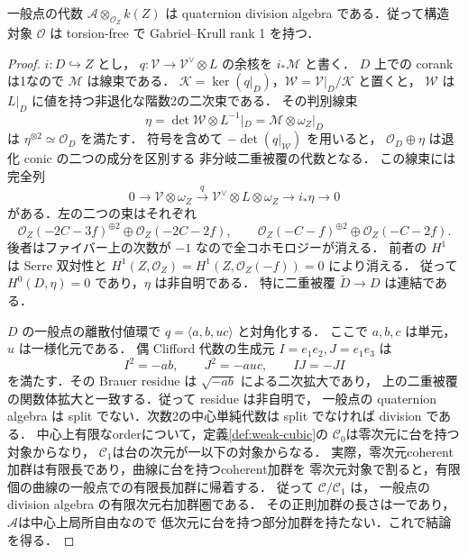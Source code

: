 \begin{proposition}
\label{prop:division-degree-three}
一般点の代数 $\mathcal A\otimes_{\mathcal O_Z}k(Z)$ は
quaternion division algebra である．従って構造対象 $\mathcal O$ は
torsion-free で Gabriel--Krull rank 1 を持つ．
\end{proposition}

\begin{proof}
$i:D\hookrightarrow Z$ とし，
$q:\mathcal V\to\mathcal V^\vee\otimes L$ の余核を $i_*\mathcal M$ と書く．
$D$ 上での corank は1なので $\mathcal M$ は線束である．
$\mathcal K=\ker(q|_D)$，$\mathcal W=\mathcal V|_D/\mathcal K$ と置くと，
$\mathcal W$ は $L|_D$ に値を持つ非退化な階数2の二次束である．
その判別線束
\[
 \eta=\det\mathcal W\otimes L^{-1}|_D
     =\mathcal M\otimes\omega_Z|_D
\]
は $\eta^{\otimes2}\simeq\mathcal O_D$ を満たす．
符号を含めて $-\det(q|_{\mathcal W})$ を用いると，
$\mathcal O_D\oplus\eta$ は退化 conic の二つの成分を区別する
非分岐二重被覆の代数となる．
この線束には完全列
\begin{equation}
 0\longrightarrow\mathcal V\otimes\omega_Z
 \xrightarrow{q}\mathcal V^\vee\otimes L\otimes\omega_Z
 \longrightarrow i_*\eta\longrightarrow0
 \label{eq:eta-resolution-degree-three}
\end{equation}
がある．左の二つの束はそれぞれ
\[
 \mathcal O_Z(-2C-3f)^{\oplus2}\oplus\mathcal O_Z(-2C-2f),
 \qquad
 \mathcal O_Z(-C-f)^{\oplus2}\oplus\mathcal O_Z(-C-2f).
\]
後者はファイバー上の次数が $-1$ なので全コホモロジーが消える．
前者の $H^1$ は Serre 双対性と
$H^1(Z,\mathcal O_Z)=H^1(Z,\mathcal O_Z(-f))=0$ により消える．
従って $H^0(D,\eta)=0$ であり，$\eta$ は非自明である．
特に二重被覆 $\widetilde D\to D$ は連結である．

$D$ の一般点の離散付値環で $q=\langle a,b,uc\rangle$ と対角化する．
ここで $a,b,c$ は単元，$u$ は一様化元である．
偶 Clifford 代数の生成元 $I=e_1e_2,J=e_1e_3$ は
\[
 I^2=-ab,\qquad J^2=-auc,\qquad IJ=-JI
\]
を満たす．その Brauer residue は $\sqrt{-ab}$ による二次拡大であり，
上の二重被覆の関数体拡大と一致する．従って residue は非自明で，
一般点の quaternion algebra は split でない．次数2の中心単純代数は
split でなければ division である．
中心上有限なorderについて，定義\ref{def:weak-cubic}の
$\mathcal C_0$は零次元に台を持つ対象からなり，
$\mathcal C_1$は台の次元が一以下の対象からなる．
実際，零次元coherent加群は有限長であり，曲線に台を持つcoherent加群を
零次元対象で割ると，有限個の曲線の一般点での有限長加群に帰着する．
従って $\mathcal C/\mathcal C_1$ は，
一般点の division algebra の有限次元右加群圏である．
その正則加群の長さは一であり，$\mathcal A$は中心上局所自由なので
低次元に台を持つ部分加群を持たない．これで結論を得る．
\end{proof}

